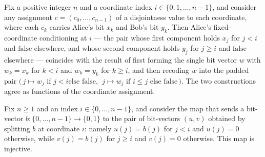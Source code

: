 \begin{theorem}
\label{CommunicationComplexity.Functions.Disjointness.RandomizedLowerBound.coordinateAliceConditioning_eq_recode_condBits}
\leanok
{}
Fix a positive integer $n$ and a coordinate index $i \in \{0, 1, \dots, n-1\}$, and
consider any assignment $c = (c_0, \dots, c_{n-1})$ of a disjointness value to each
coordinate, where each $c_k$ carries Alice's bit $x_k$ and Bob's bit $y_k$. Then Alice's
fixed-coordinate conditioning at $i$ — the pair whose first component holds $x_j$ for $j
< i$ and $\mathrm{false}$ elsewhere, and whose second component holds $y_j$ for $j \ge
i$ and $\mathrm{false}$ elsewhere — coincides with the result of first forming the
single bit vector $w$ with $w_k = x_k$ for $k < i$ and $w_k = y_k$ for $k \ge i$, and
then recoding $w$ into the padded pair $\bigl(\,j \mapsto w_j \text{ if } j < i \text{
else } \mathrm{false},\ \ j \mapsto w_j \text{ if } i \le j \text{ else }
\mathrm{false}\,\bigr)$. The two constructions agree as functions of the coordinate
assignment.
\end{theorem}

\begin{theorem}
\label{CommunicationComplexity.Functions.Disjointness.RandomizedLowerBound.coordinateAliceConditioningOfCondBits_injective}
\leanok
{}
Fix $n \ge 1$ and an index $i \in \{0,\dots,n-1\}$, and consider the map that sends a
bit-vector $b \colon \{0,\dots,n-1\} \to \{0,1\}$ to the pair of bit-vectors $(u, v)$
obtained by splitting $b$ at coordinate $i$: namely $u(j) = b(j)$ for $j < i$ and $u(j)
= 0$ otherwise, while $v(j) = b(j)$ for $j \ge i$ and $v(j) = 0$ otherwise. This map is
injective.
\end{theorem}

